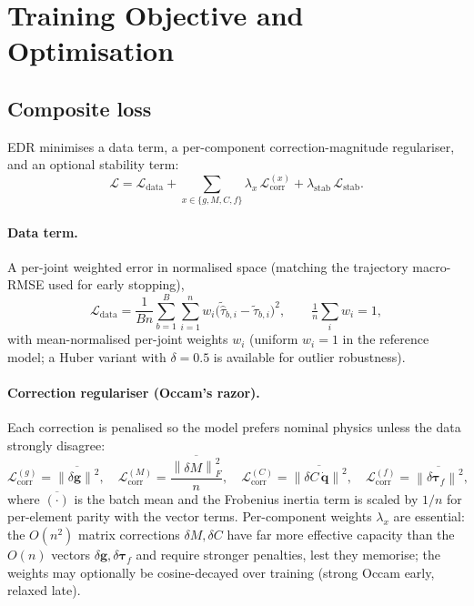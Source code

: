 \documentclass[11pt]{article}
\newcommand{\qd}{\dot{\bm{q}}}
\newcommand{\dg}{\delta\bm{g}}
\newcommand{\dM}{\delta\!M}
\newcommand{\dC}{\delta C}
\newcommand{\dtf}{\delta\bm{\tau}_f}
\newcommand{\norm}[1]{\left\lVert #1 \right\rVert}
\theoremstyle{definition}
\theoremstyle{plain}
\begin{document}
\section{Training Objective and Optimisation}
\label{sec:loss}
\subsection{Composite loss}
EDR minimises a data term, a per-component correction-magnitude regulariser, and
an optional stability term:
\begin{equation}
\mathcal L=\mathcal L_{\mathrm{data}}
+\sum_{x\in\{g,M,C,f\}}\lambda_x\,\mathcal L^{(x)}_{\mathrm{corr}}
+\lambda_{\mathrm{stab}}\,\mathcal L_{\mathrm{stab}} .
\label{eq:loss}
\end{equation}

\paragraph{Data term.}
A per-joint weighted error in normalised space (matching the trajectory
macro-RMSE used for early stopping),
\begin{equation}
\mathcal L_{\mathrm{data}}=\frac{1}{Bn}\sum_{b=1}^{B}\sum_{i=1}^{n}w_i\big(\tilde{\hat\tau}_{b,i}-\tilde\tau_{b,i}\big)^2,
\qquad \tfrac1n\sum_i w_i=1,
\label{eq:ldata}
\end{equation}
with mean-normalised per-joint weights $w_i$ (uniform $w_i=1$ in the reference
model; a Huber variant with $\delta=0.5$ is available for outlier robustness).

\paragraph{Correction regulariser (Occam's razor).}
Each correction is penalised so the model prefers nominal physics unless the data
strongly disagree:
\begin{equation}
\mathcal L^{(g)}_{\mathrm{corr}}=\overline{\norm{\dg}^2},\quad
\mathcal L^{(M)}_{\mathrm{corr}}=\frac{\overline{\norm{\dM}_F^2}}{n},\quad
\mathcal L^{(C)}_{\mathrm{corr}}=\overline{\norm{\dC\,\qd}^2},\quad
\mathcal L^{(f)}_{\mathrm{corr}}=\overline{\norm{\dtf}^2},
\label{eq:lcorr}
\end{equation}
where $\overline{(\cdot)}$ is the batch mean and the Frobenius inertia term is
scaled by $1/n$ for per-element parity with the vector terms. Per-component
weights $\lambda_x$ are essential: the $O(n^2)$ matrix corrections $\dM,\dC$ have
far more effective capacity than the $O(n)$ vectors $\dg,\dtf$ and require stronger
penalties, lest they memorise; the weights may optionally be cosine-decayed over
training (strong Occam early, relaxed late).
\end{document}
